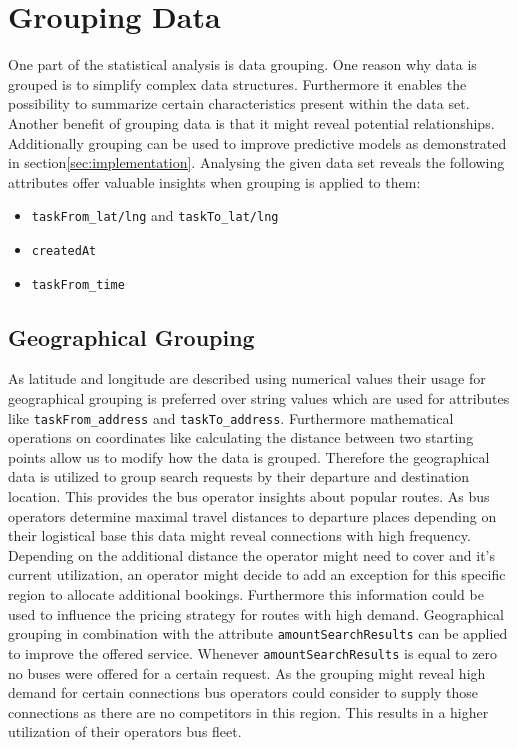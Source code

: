 \section{Grouping Data}
One part of the statistical analysis is data grouping. One reason why data is grouped is to simplify complex data structures. Furthermore it enables the possibility to summarize certain characteristics present within the data set. Another benefit of grouping data is that it might reveal potential relationships. Additionally grouping can be used to improve predictive models as demonstrated in section\ref{sec:implementation}.
Analysing the given data set reveals the following attributes offer valuable insights when grouping is applied to them: 
\begin{itemize}
\item \verb|taskFrom_lat/lng| and \verb|taskTo_lat/lng|
\item \verb|createdAt|
\item \verb|taskFrom_time|
\end{itemize}
\subsection{Geographical Grouping}
As latitude and longitude are described using numerical values their usage for geographical grouping is preferred over string values which are used for attributes like \verb|taskFrom_address| and \verb|taskTo_address|. Furthermore mathematical operations on coordinates like calculating the distance between two starting points allow us to modify how the data is grouped. Therefore the geographical data is utilized to group search requests by their departure and destination location. This provides the bus operator insights about popular routes. As bus operators determine maximal travel distances to departure places depending on their logistical base this data might reveal connections with high frequency. Depending on the additional distance the operator might need to cover and it's current utilization, an operator might decide to add an exception for this specific region to allocate additional bookings. Furthermore this information could be used to influence the pricing strategy for routes with high demand.
Geographical grouping in combination with the attribute \verb|amountSearchResults| can be applied to improve the offered service. Whenever \verb|amountSearchResults| is equal to zero no buses were offered for a certain request. As the grouping might reveal high demand for certain connections bus operators could consider to supply those connections as there are no competitors in this region. This results in a higher utilization of their operators bus fleet. 
